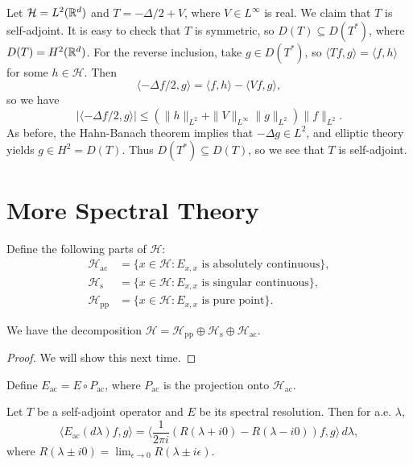 \begin{example}
  Let $\mathcal{H} = L^2(\mathbb{R}^d)$ and
  $T = - \Delta / 2 + V$, where $V \in L^\infty$ is
  real. We claim that $T$ is self-adjoint. It is easy to check
  that $T$ is symmetric, so $D(T) \subseteq D(T^*)$,
  where $D(T) = H^2(\mathbb{R}^d)$. For the reverse inclusion,
  take $g \in D(T^*)$, so $\langle Tf, g \rangle = \langle f, h \rangle$
  for some $h \in \mathcal{H}$. Then
  \[
    \langle -\Delta f / 2, g \rangle
    = \langle f, h \rangle - \langle Vf, g \rangle,
  \]
  so we have
  \[
    | \langle - \Delta f / 2, g \rangle | 
    \le (\| h \|_{L^2} + \| V \|_{L^\infty}\| g \|_{L^2}) \| f \|_{L^2}.
  \]
  As before, the Hahn-Banach theorem implies that
  $-\Delta g \in L^2$, and elliptic theory yields
  $g \in H^2 = D(T)$. Thus $D(T^*) \subseteq D(T)$, so
  we see that $T$ is self-adjoint.
\end{example}

\section{More Spectral Theory}

\begin{definition}
  Define the following parts of $\mathcal{H}$:
  \begin{align*}
    \mathcal{H}_{\mathrm{ac}}
    &= \{x \in \mathcal{H} : E_{x, x} \text{ is absolutely continuous}\}, \\
    \mathcal{H}_{\mathrm{s}}
    &= \{x \in \mathcal{H} : E_{x, x} \text{ is singular continuous}\}, \\
    \mathcal{H}_{\mathrm{pp}}
    &= \{x \in \mathcal{H} : E_{x, x} \text{ is pure point}\}.
  \end{align*}
\end{definition}

\begin{lemma}
  We have the decomposition
  $\mathcal{H} = \mathcal{H}_{\mathrm{pp}} \oplus \mathcal{H}_{\mathrm{s}} \oplus \mathcal{H}_{\mathrm{ac}}$.
\end{lemma}

\begin{proof}
  We will show this next time.
\end{proof}

\begin{definition}
  Define $E_{\mathrm{ac}} = E \circ P_{\mathrm{ac}}$, where
  $P_{\mathrm{ac}}$ is the projection onto
  $\mathcal{H}_{\mathrm{ac}}$.
\end{definition}

\begin{lemma}
  Let $T$ be a self-adjoint operator and $E$ be its
  spectral resolution. Then for a.e. $\lambda$,
  \[
    \langle E_{\mathrm{ac}}(d\lambda) f, g \rangle
    = \langle \frac{1}{2\pi i} (R(\lambda + i0) - R(\lambda - i0)) f, g \rangle\, d \lambda,
  \]
  where $R(\lambda \pm i0) = \lim_{\epsilon \to 0} R(\lambda \pm i\epsilon)$.
\end{lemma}
